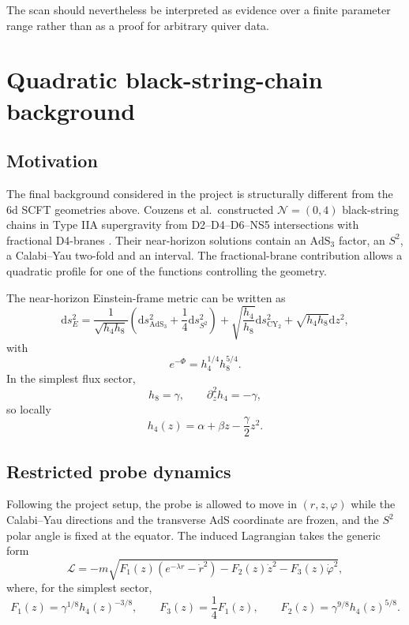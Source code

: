 \documentclass[11pt,a4paper]{article}
\theoremstyle{plain}
\theoremstyle{definition}
\theoremstyle{remark}
\begin{document}
The scan should nevertheless be interpreted as evidence over a finite parameter range rather than as a proof for arbitrary quiver data.

\section{Quadratic black-string-chain background}
\label{sec:blackstring}

\subsection{Motivation}

The final background considered in the project is structurally different from the 6d SCFT geometries above. Couzens et al.\ constructed $\mathcal N=(0,4)$ black-string chains in Type IIA supergravity from D2--D4--D6--NS5 intersections with fractional D4-branes \cite{Couzens:2021tnq}. Their near-horizon solutions contain an $\mathrm{AdS}_3$ factor, an $S^2$, a Calabi--Yau two-fold and an interval. The fractional-brane contribution allows a quadratic profile for one of the functions controlling the geometry.

The near-horizon Einstein-frame metric can be written as
\begin{equation*}
\mathrm d s_E^2
=
\frac1{\sqrt{h_4h_8}}
\left(
\mathrm d s_{\mathrm{AdS}_3}^2+\frac14\mathrm d s_{S^2}^2
\right)
+
\sqrt{\frac{h_4}{h_8}}\mathrm d s_{\mathrm{CY}_2}^2
+
\sqrt{h_4h_8}\mathrm d z^2,
\end{equation*}
with
\begin{equation*}
e^{-\Phi}=h_4^{1/4}h_8^{5/4}.
\end{equation*}
In the simplest flux sector,
\begin{equation*}
h_8=\gamma,
\qquad
\partial_z^2h_4=-\gamma,
\end{equation*}
so locally
\begin{equation*}
h_4(z)
=
\alpha+\beta z-\frac{\gamma}{2}z^2.
\end{equation*}

\subsection{Restricted probe dynamics}

Following the project setup, the probe is allowed to move in $(r,z,\varphi)$ while the Calabi--Yau directions and the transverse AdS coordinate are frozen, and the $S^2$ polar angle is fixed at the equator. The induced Lagrangian takes the generic form
\begin{equation}
\mathcal L
=
-m\sqrt{
F_1(z)(e^{-\lambda r}-\dot r^2)
-F_2(z)\dot z^2
-F_3(z)\dot\varphi^2
},
\label{eq:blackstring-lagrangian}
\end{equation}
where, for the simplest sector,
\begin{equation}
\boxed{
F_1(z)=\gamma^{1/8}h_4(z)^{-3/8},
\qquad
F_3(z)=\frac14F_1(z),
\qquad
F_2(z)=\gamma^{9/8}h_4(z)^{5/8}.
}
\label{eq:blackstring-Fi}
\end{equation}
\end{document}
